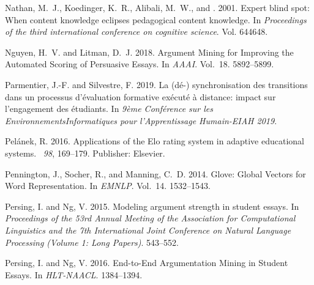 \documentclass[notitlepage,12pt]{jedm}
\begin{document}
\begin{thebibliography}{}
{\sc Nathan, M.~J.}, {\sc Koedinger, K.~R.}, {\sc Alibali, M.~W.}, {\sc and}
  {}. 2001.
\newblock Expert blind spot: {When} content knowledge eclipses pedagogical
  content knowledge.
\newblock In {\em Proceedings of the third international conference on
  cognitive science}. Vol. 644648.

{\sc Nguyen, H.~V.} {\sc and} {\sc Litman, D.~J.} 2018.
\newblock Argument {Mining} for {Improving} the {Automated} {Scoring} of
  {Persuasive} {Essays}.
\newblock In {\em {AAAI}}. Vol.~18. 5892--5899.

{\sc Parmentier, J.-F.} {\sc and} {\sc Silvestre, F.} 2019.
\newblock La (d{\'e}-) synchronisation des transitions dans un processus
  d'{\'e}valuation formative ex{\'e}cut{\'e} {\`a} distance: impact sur
  l'engagement des {\'e}tudiants.
\newblock In {\em 9{\`e}me Conf{\'e}rence sur les EnvironnementsInformatiques
  pour l’Apprentissage Humain-EIAH 2019}.

{\sc Pelánek, R.} 2016.
\newblock Applications of the {Elo} rating system in adaptive educational
  systems.
~{\em 98}, 169--179.
\newblock Publisher: Elsevier.

{\sc Pennington, J.}, {\sc Socher, R.}, {\sc and} {\sc Manning, C.~D.} 2014.
\newblock Glove: {Global} {Vectors} for {Word} {Representation}.
\newblock In {\em {EMNLP}}. Vol.~14. 1532--1543.

{\sc Persing, I.} {\sc and} {\sc Ng, V.} 2015.
\newblock Modeling argument strength in student essays.
\newblock In {\em Proceedings of the 53rd {Annual} {Meeting} of the
  {Association} for {Computational} {Linguistics} and the 7th {International}
  {Joint} {Conference} on {Natural} {Language} {Processing} ({Volume} 1: {Long}
  {Papers})}. 543--552.

{\sc Persing, I.} {\sc and} {\sc Ng, V.} 2016.
\newblock End-to-{End} {Argumentation} {Mining} in {Student} {Essays}.
\newblock In {\em {HLT}-{NAACL}}. 1384--1394.


\end{thebibliography}
\end{document}
